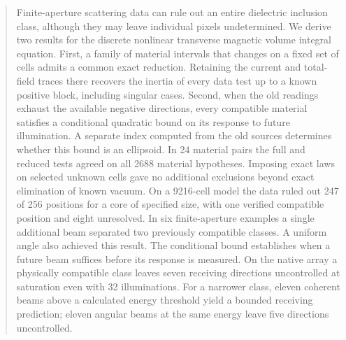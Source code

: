 \begin{abstract}
Finite-aperture scattering data can rule out an entire dielectric inclusion class, although they may leave individual pixels undetermined. We derive two results for the discrete nonlinear transverse magnetic volume integral equation. First, a family of material intervals that changes on a fixed set of cells admits a common exact reduction. Retaining the current and total-field traces there recovers the inertia of every data test up to a known positive block, including singular cases. Second, when the old readings exhaust the available negative directions, every compatible material satisfies a conditional quadratic bound on its response to future illumination. A separate index computed from the old sources determines whether this bound is an ellipsoid. In 24 material pairs the full and reduced tests agreed on all 2688 material hypotheses. Imposing exact laws on selected unknown cells gave no additional exclusions beyond exact elimination of known vacuum. On a 9216-cell model the data ruled out 247 of 256 positions for a core of specified size, with one verified compatible position and eight unresolved. In six finite-aperture examples a single additional beam separated two previously compatible classes. A uniform angle also achieved this result. The conditional bound establishes when a future beam suffices before its response is measured. On the native array a physically compatible class leaves seven receiving directions uncontrolled at saturation even with 32 illuminations. For a narrower class, eleven coherent beams above a calculated energy threshold yield a bounded receiving prediction; eleven angular beams at the same energy leave five directions uncontrolled.
\end{abstract}
